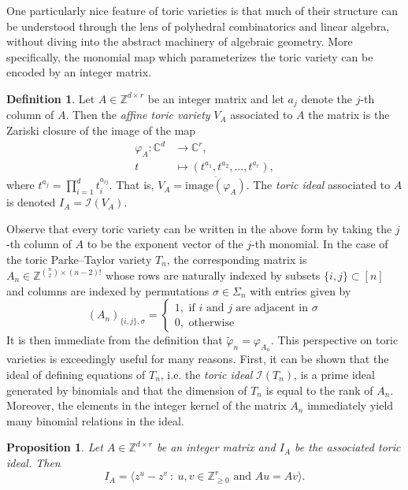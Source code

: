 \documentclass[12pt, reqno]{amsart}
\numberwithin{equation}{section}
\theoremstyle{plain}
\newtheorem{proposition}[theorem]{Proposition}
\theoremstyle{definition}
\newtheorem{definition}[theorem]{Definition}
\newcommand{\cc}{\mathbb{C}}
\newcommand{\zz}{\mathbb{Z}}
\newcommand{\ci}{\mathcal{I}}
\begin{document}
One particularly nice feature of toric varieties is that much of their structure can be understood through the lens of polyhedral combinatorics and linear algebra, without diving into the abstract machinery of algebraic geometry. More specifically, the monomial map which parameterizes the toric variety can be encoded by an integer matrix. 


\begin{definition}
Let $A \in \zz^{d \times r}$ be an integer matrix and let $a_j$ denote the $j$-th column of $A$. Then the \emph{affine toric variety} $V_A$ associated to $A$ the matrix is the Zariski closure of the image of the map
\begin{align*}
\varphi_A : \cc^d &\to \cc^r, \\
             t  &\mapsto (t^{a_1}, t^{a_2}, \ldots, t^{a_r}),
\end{align*}
where $t^{a_j} = \prod_{i = 1}^d t_i^{a_{ij}}$. That is, $V_A = \overline{\mathrm{image}(\varphi_A)}$. The \emph{toric ideal} associated to $A$ is denoted $I_A = \mathcal{I}(V_A)$. 
\end{definition}

Observe that every toric variety can be written in the above form by taking the $j$-th column of $A$ to be the exponent vector of the $j$-th monomial. In the case of the toric Parke--Taylor  variety $T_n$, the corresponding matrix is $A_n \in \zz^{\binom{n}{2} \times (n-2)!}$ whose rows are naturally indexed by subsets $\{i, j\}\subset[n]$ and columns are indexed by permutations $\sigma \in \Sigma_n$ with entries given by
\[
(A_n)_{\{i, j\}, \sigma} =
\begin{cases}
1, \mbox{ if } i \mbox{ and } j \mbox{ are adjacent in } \sigma \\
0, \mbox{ otherwise}
\end{cases}
\]
It is then immediate from the definition that $\tilde{\varphi}_n = \varphi_{A_n}$. This perspective on toric varieties is exceedingly useful for many reasons. First, it can be shown that the ideal of defining equations of $T_n$, i.e. the \emph{toric ideal} $\ci(T_n)$, is a prime ideal generated by binomials \cite[Chapter 4]{sturmfels1996groebner} and that the dimension of $T_n$ is equal to the rank of $A_n$. Moreover, the elements in the integer kernel of the matrix $A_n$ immediately yield many binomial relations in the ideal. 

\begin{proposition}\cite[Chapter 4]{sturmfels1996groebner}
Let $A \in \zz^{d \times r}$ be an integer matrix and $I_A$ be the associated toric ideal. Then
\[
I_A = \langle z^u - z^v ~:~ u, v \in \zz_{\geq 0}^r \mbox{ and } Au = Av \rangle.
\]
\end{proposition}
\end{document}
